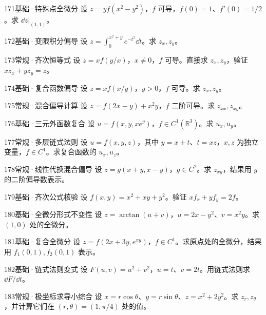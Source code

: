 \begin{exercise}{171}{基础·特殊点全微分}
设 $z=yf(x^2-y^2)$，$f$ 可导，$f(0)=1$、$f'(0)=1/2$。求 $\dd z|_{(1,1)}$。
\end{exercise}
\begin{exercise}{172}{基础·变限积分偏导}
设 $z=\int_0^{x^2+y}e^{-t^2}\dd t$。求 $z_x,z_y$。
\end{exercise}
\begin{exercise}{173}{常规·齐次恒等式}
设 $z=xf(y/x)$，$x\ne0$，$f$ 可导。直接求 $z_x,z_y$，验证 $xz_x+yz_y=z$。
\end{exercise}
\begin{exercise}{174}{基础·复合函数偏导}
设 $z=xf(x/y)$，$y>0$，$f$ 可导。求 $z_x,z_y$。
\end{exercise}
\begin{exercise}{175}{常规·混合偏导计算}
设 $z=f(2x-y)+x^2y$，$f$ 二阶可导。求 $z_{xx},z_{xy}$。
\end{exercise}
\begin{exercise}{176}{基础·三元外函数复合}
设 $u=f(x,y,xe^y)$，$f\in C^1(\mathbb R^3)$。求 $u_x,u_y$。
\end{exercise}
\begin{exercise}{177}{常规·多层链式法则}
设 $u=f(x,y,z)$，其中 $y=x+t$、$t=xz$，$x,z$ 为独立变量，$f\in C^1$。求复合函数的 $u_x,u_z$。
\end{exercise}
\begin{exercise}{178}{常规·线性代换混合偏导}
设 $z=g(x+y,x-y)$，$g\in C^2$。求 $z_{xy}$，结果用 $g$ 的二阶偏导数表示。
\end{exercise}
\begin{exercise}{179}{基础·齐次公式核验}
设 $f(x,y)=x^2+xy+y^2$。验证 $xf_x+yf_y=2f$。
\end{exercise}
\begin{exercise}{180}{基础·全微分形式不变性}
设 $z=\arctan(u+v)$，$u=2x-y^2$、$v=x^2y$。求 $(1,0)$ 处的全微分。
\end{exercise}
\begin{exercise}{181}{基础·复合全微分}
设 $z=f(2x+3y,e^{xy})$，$f\in C^1$。求原点处的全微分，结果用 $f_1(0,1),f_2(0,1)$ 表示。
\end{exercise}
\begin{exercise}{182}{基础·链式法则变式}
设 $F(u,v)=u^2+v^2$，$u=t$、$v=2t$。用链式法则求 $\dd F/\dd t$。
\end{exercise}
\begin{exercise}{183}{常规·极坐标求导小综合}
设 $x=r\cos\theta$、$y=r\sin\theta$、$z=x^2+2y^2$。求 $z_r,z_\theta$，并计算它们在 $(r,\theta)=(1,\pi/4)$ 处的值。
\end{exercise}
